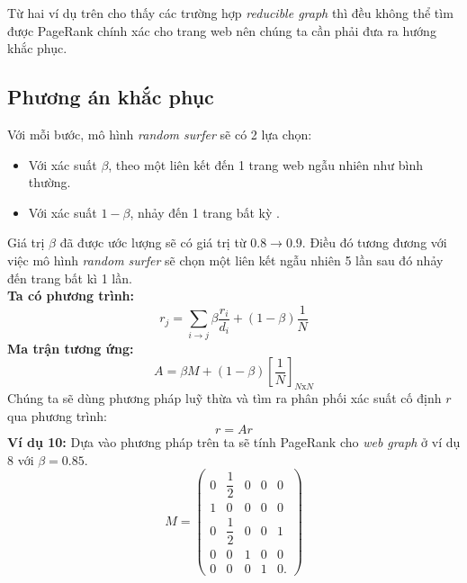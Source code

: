 Từ hai ví dụ trên cho thấy các trường hợp \emph{reducible graph} thì đều không thể tìm được PageRank chính xác cho trang web nên chúng ta cần phải đưa ra hướng khắc phục.
\subsection{Phương án khắc phục}
Với mỗi bước, mô hình \textit{random surfer} sẽ có 2 lựa chọn: 
\begin{itemize}
    \item Với xác suất $\beta$, theo một liên kết đến 1 trang web ngẫu nhiên như bình thường.
    \item Với xác suất $1-\beta$, nhảy đến 1 trang bất kỳ .
\end{itemize}
Giá trị $\beta$ đã được ước lượng sẽ có giá trị từ $0.8 \rightarrow 0.9$. Điều đó tương đương với việc mô hình \textit{random surfer} sẽ chọn một liên kết ngẫu nhiên 5 lần sau đó nhảy đến trang bất kì 1 lần.\\[10pt]
\textbf{Ta có phương trình:}
$$r_j = \sum_{i \rightarrow j}\beta\dfrac{r_i}{d_i} + (1-\beta)\dfrac{1}{N}$$
\textbf{Ma trận tương ứng:}
$$ A = \beta M + (1 - \beta) \left[\dfrac{1}{N}\right]_{N\text{x}N} $$
Chúng ta sẽ dùng phương pháp luỹ thừa và tìm ra phân phối xác suất cố định $r$ qua phương trình: 
$$r=Ar$$
\textbf{Ví dụ 10:} Dựa vào phương pháp trên ta sẽ tính PageRank cho \textit{web graph} ở ví dụ 8 với $\beta = 0.85$.
     $$ M = 
            \begin{pmatrix}
                  0 & \dfrac{1}{2} & 0 & 0 & 0 \\[10pt]
                1 & 0 & 0 & 0 & 0 \\[10pt]
                0 & \dfrac{1}{2} & 0 & 0 & 1 \\[10pt]
                0 & 0 & 1 & 0 & 0 \\[10pt]
                0 & 0 & 0 & 1 & 0.
            \end{pmatrix}
    $$

